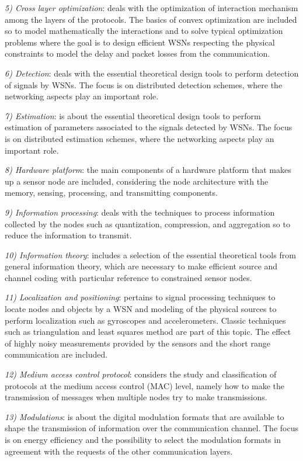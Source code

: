 \documentclass[onecolumn,12pt,draftclsnofoot,a4paper,peerreview]{IEEEtran}
\begin{document}
{\em 5) Cross layer optimization}: deals with the optimization of interaction mechanism among the layers of the protocols. The basics of convex optimization are included so to model mathematically the interactions and to solve typical optimization problems where the goal is to design efficient WSNs respecting the physical constraints to model the delay and packet losses from the communication.

{\em 6) Detection}: deals with the essential theoretical design tools to perform detection of signals by WSNs. The focus is on distributed detection schemes, where the networking aspects play an important role.  

{\em 7) Estimation}: is about the essential theoretical design tools to perform estimation of parameters associated to the signals detected by WSNs. The focus is on distributed estimation schemes, where the networking aspects play an important role.  

{\em 8) Hardware platform}: the main components of a hardware platform that makes up a sensor node are included, considering the node architecture with the memory, sensing, processing, and transmitting components. 

{\em 9) Information processing}: deals with the techniques to process information collected by the nodes such as quantization, compression, and aggregation so to reduce the information to transmit. 

{\em 10) Information theory}: includes a selection of the essential
theoretical tools from general information theory, which are necessary to make efficient source and channel coding with particular reference to constrained sensor nodes.

{\em 11) Localization and positioning}: pertains to signal processing techniques to locate nodes and objects by a WSN and modeling of the physical sources to perform localization such as gyroscopes and accelerometers. Classic techniques such as triangulation and least squares method are part of this topic. The effect of highly noisy measurements provided by the sensors and the short range communication are  included. 

{\em 12) Medium access control protocol}: considers the study and classification of protocols at the medium access control (MAC) level, namely how to make the transmission of messages when multiple nodes try to make transmissions. 

{\em 13) Modulations}: is about the digital modulation formats that are available to shape the transmission of information over the communication channel. The focus is on energy efficiency and the possibility to select the modulation formats in agreement with the requests of the other communication layers. 
\end{document}
